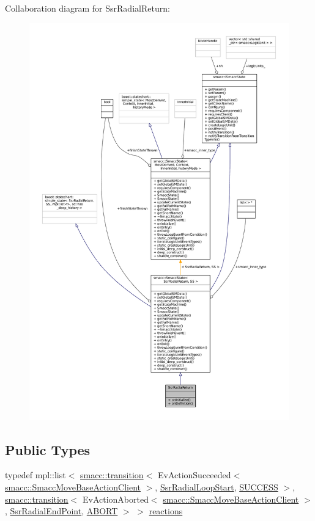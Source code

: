 Collaboration diagram for Ssr\+Radial\+Return\+:
\nopagebreak
\begin{figure}[H]
\begin{center}
\leavevmode
\includegraphics[width=350pt]{structSsrRadialReturn__coll__graph}
\end{center}
\end{figure}
\subsection*{Public Types}
\begin{DoxyCompactItemize}
\item 
typedef mpl\+::list$<$ \hyperlink{classsmacc_1_1transition}{smacc\+::transition}$<$ Ev\+Action\+Succeeded$<$ \hyperlink{classsmacc_1_1SmaccMoveBaseActionClient}{smacc\+::\+Smacc\+Move\+Base\+Action\+Client} $>$, \hyperlink{structSsrRadialLoopStart}{Ssr\+Radial\+Loop\+Start}, \hyperlink{classSUCCESS}{S\+U\+C\+C\+E\+SS} $>$, \hyperlink{classsmacc_1_1transition}{smacc\+::transition}$<$ Ev\+Action\+Aborted$<$ \hyperlink{classsmacc_1_1SmaccMoveBaseActionClient}{smacc\+::\+Smacc\+Move\+Base\+Action\+Client} $>$, \hyperlink{structSsrRadialEndPoint}{Ssr\+Radial\+End\+Point}, \hyperlink{classABORT}{A\+B\+O\+RT} $>$ $>$ \hyperlink{structSsrRadialReturn_ae9ba2d9194983c0effd1ff54cecdc23e}{reactions}
\end{DoxyCompactItemize}

